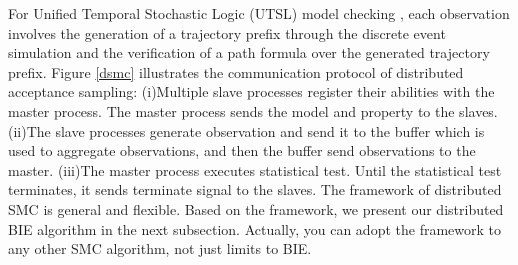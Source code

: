 \begin{figure}[htbp]
\end{figure}

For Unified Temporal Stochastic Logic (UTSL) model checking \cite{Younes2004Planning}, each observation involves the generation of a trajectory prefix through the discrete event simulation and the verification of a path formula over the generated trajectory prefix. Figure \ref{dsmc} illustrates the communication protocol of distributed acceptance sampling: (i)Multiple slave processes register their abilities with the master process. The master process sends the model and property to the slaves. (ii)The slave processes generate observation and send it to the buffer which is used to aggregate observations, and then the buffer send observations to the master. (iii)The master process executes statistical test. Until the statistical test terminates, it sends terminate signal to the slaves. The framework of distributed SMC is general and flexible. Based on the framework, we present our distributed BIE algorithm in the next subsection. Actually, you can adopt the framework to any other SMC algorithm, not just limits to BIE.

